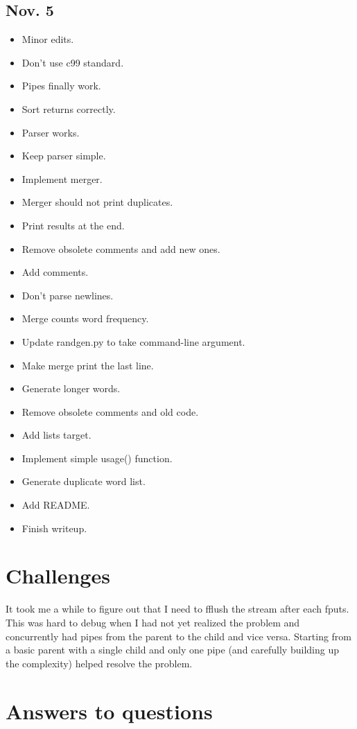 \documentclass[12pt,letterpaper]{article}
\begin{document}
\subsection*{Nov. 5}

\begin{itemize}
	\item Minor edits.
	\item Don't use c99 standard.
	\item Pipes finally work.
	\item Sort returns correctly.
	\item Parser works.
	\item Keep parser simple.
	\item Implement merger.
	\item Merger should not print duplicates.
	\item Print results at the end.
	\item Remove obsolete comments and add new ones.
	\item Add comments.
	\item Don't parse newlines.
	\item Merge counts word frequency.
	\item Update randgen.py to take command-line argument.
	\item Make merge print the last line.
	\item Generate longer words.
	\item Remove obsolete comments and old code.
	\item Add lists target.
	\item Implement simple usage() function.
	\item Generate duplicate word list.
	\item Add README.
	\item Finish writeup.
\end{itemize}


\section*{Challenges}

It took me a while to figure out that I need to fflush the stream after each fputs. This was hard to debug when I had not yet realized the problem and concurrently had pipes from the parent to the child and vice versa. Starting from a basic parent with a single child and only one pipe (and carefully building up the complexity) helped resolve the problem.


\section*{Answers to questions}
\end{document}
